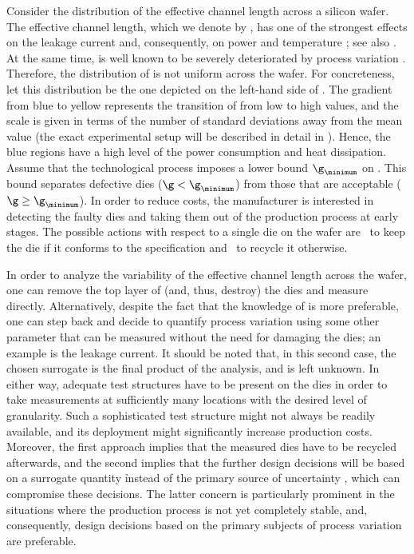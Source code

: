 Consider the distribution of the effective channel length across a silicon
wafer. The effective channel length, which we denote by \g, has one of the
strongest effects on the leakage current and, consequently, on power and
temperature \cite{juan2012}; see also . At the same time, \g
is well known to be severely deteriorated by process variation
\cite{chandrakasan2000, srivastava2010}. Therefore, the distribution of \g is
not uniform across the wafer. For concreteness, let this distribution be the one
depicted on the left-hand side of . The gradient from
blue to yellow represents the transition of \g from low to high values, and the
scale is given in terms of the number of standard deviations away from the mean
value (the exact experimental setup will be described in detail in
). Hence, the blue regions have a high level of the
power consumption and heat dissipation. Assume that the technological process
imposes a lower bound $\g_\minimum$ on \g. This bound separates defective dies
($\g < \g_\minimum$) from those that are acceptable ($\g \geq \g_\minimum$). In
order to reduce costs, the manufacturer is interested in detecting the faulty
dies and taking them out of the production process at early stages. The possible
actions with respect to a single die on the wafer are \one~to keep the die if it
conforms to the specification and \two~to recycle it otherwise.

In order to analyze the variability of the effective channel length \g across
the wafer, one can remove the top layer of (and, thus, destroy) the dies and
measure \g directly. Alternatively, despite the fact that the knowledge of \g is
more preferable, one can step back and decide to quantify process variation
using some other parameter \h that can be measured without the need for damaging
the dies; an example is the leakage current. It should be noted that, in this
second case, the chosen surrogate is the final product of the analysis, and \g
is left unknown. In either way, adequate test structures have to be present on
the dies in order to take measurements at sufficiently many locations with the
desired level of granularity. Such a sophisticated test structure might not
always be readily available, and its deployment might significantly increase
production costs. Moreover, the first approach implies that the measured dies
have to be recycled afterwards, and the second implies that the further design
decisions will be based on a surrogate quantity \h instead of the primary source
of uncertainty \g, which can compromise these decisions. The latter concern is
particularly prominent in the situations where the production process is not yet
completely stable, and, consequently, design decisions based on the primary
subjects of process variation are preferable.

